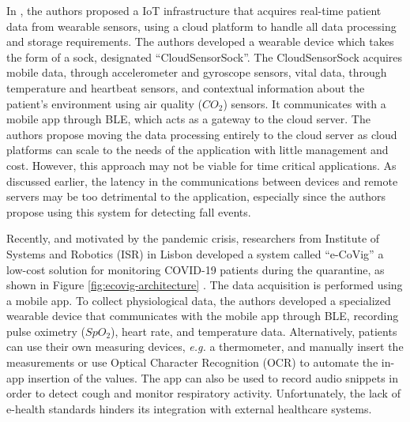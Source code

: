 In \cite{Doukas2012}, the authors proposed a \acs{IoT} infrastructure that acquires real-time patient data from wearable sensors, using a cloud platform to handle all data processing and storage requirements. The authors developed a wearable device which takes the form of a sock, designated ``CloudSensorSock''. The CloudSensorSock acquires mobile data, through accelerometer and gyroscope sensors, vital data, through temperature and heartbeat sensors, and contextual information about the patient's environment using air quality ($CO_2$) sensors. It communicates with a mobile app through \acs{BLE}, which acts as a gateway to the cloud server. The authors propose moving the data processing entirely to the cloud server as cloud platforms can scale to the needs of the application with little management and cost. However, this approach may not be viable for time critical applications. As discussed earlier, the latency in the communications between devices and remote servers may be too detrimental to the application, especially since the authors propose using this system for detecting fall events. \bigskip

%
%

Recently, and motivated by the pandemic crisis, researchers from Institute of Systems and Robotics (ISR) in Lisbon developed a system called ``e-CoVig'' a low-cost solution for monitoring COVID-19 patients during the quarantine, as shown in Figure \ref{fig:ecovig-architecture} \cite{BrainAnswer}. The data acquisition is performed using a mobile app. To collect physiological data, the authors developed a specialized wearable device that communicates with the mobile app through \acs{BLE}, recording pulse oximetry ($SpO_2$), heart rate, and temperature data. Alternatively, patients can use their own measuring devices, \textit{e.g.} a thermometer, and manually insert the measurements or use Optical Character Recognition (OCR) to automate the in-app insertion of the values. The app can also be used to record audio snippets in order to detect cough and monitor respiratory activity. Unfortunately, the lack of e-health standards hinders its integration with external healthcare systems. 


